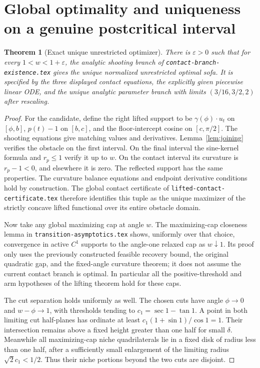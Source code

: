 \documentclass[11pt]{article}
\newtheorem{theorem}{Theorem}[section]
\begin{document}
\section{Global optimality and uniqueness on a genuine postcritical interval}
\begin{theorem}[Exact unique unrestricted optimizer]\label{thm:main}
There is $\varepsilon>0$ such that for every $1<w<1+\varepsilon$, the analytic shooting branch of \texttt{contact-branch-existence.tex} gives the unique normalized unrestricted optimal sofa. It is specified by the three displayed contact equations, the explicitly given piecewise linear ODE, and the unique analytic parameter branch with limits $(3/16,3/2,2)$ after rescaling.
\end{theorem}
\begin{proof}
For the candidate, define the right lifted support to be $\gamma(\phi)\cdot u_t$ on $[\phi,b]$, $p(t)-1$ on $[b,c]$, and the floor-intercept cosine on $[c,\pi/2]$. The shooting equations give matching values and derivatives. Lemma~\ref{lem:joining} verifies the obstacle on the first interval. On the final interval the sine-kernel formula and $r_p\le1$ verify it up to $w$. On the contact interval its curvature is $r_p-1<0$, and elsewhere it is zero. The reflected support has the same properties. The curvature balance equations and endpoint derivative conditions hold by construction. The global contact certificate of \texttt{lifted-contact-certificate.tex} therefore identifies this tuple as the unique maximizer of the strictly concave lifted functional over its entire obstacle domain.

Now take any global maximizing cap at angle $w$. The maximizing-cap closeness lemma in \texttt{transition-asymptotics.tex} shows, uniformly over that choice, convergence in active $C^1$ supports to the angle-one relaxed cap as $w\downarrow1$. Its proof only uses the previously constructed feasible recovery bound, the original quadratic gap, and the fixed-angle curvature theorem; it does not assume the current contact branch is optimal. In particular all the positive-threshold and arm hypotheses of the lifting theorem hold for these caps.

The cut separation holds uniformly as well. The chosen cuts have angle $\phi\to0$ and $w-\phi\to1$, with thresholds tending to $c_1=\sec1-\tan1$. A point in both limiting cut half-planes has ordinate at least $c_1(1+\sin1)/\cos1=1$. Their intersection remains above a fixed height greater than one half for small $\delta$. Meanwhile all maximizing-cap niche quadrilaterals lie in a fixed disk of radius less than one half, after a sufficiently small enlargement of the limiting radius $\sqrt2c_1<1/2$. Thus their niche portions beyond the two cuts are disjoint.


\end{proof}
\end{document}
